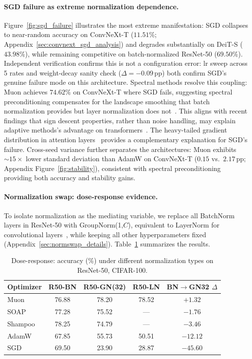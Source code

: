 \paragraph{SGD failure as extreme normalization dependence.}
Figure~\ref{fig:sgd_failure} illustrates the most extreme manifestation: SGD collapses to near-random accuracy on ConvNeXt-T ($11.51\%$; Appendix~\ref{sec:convnext_sgd_analysis}) and degrades substantially on DeiT-S ($43.98\%$), while remaining competitive on batch-normalized ResNet-50 ($69.50\%$).
Independent verification confirms this is not a configuration error: lr sweep across 5 rates and weight-decay sanity check ($\Delta{=}{-}0.09$\,pp) both confirm SGD's genuine failure mode on this architecture.
Spectral methods resolve this coupling: Muon achieves $74.62\%$ on ConvNeXt-T where SGD fails, suggesting spectral preconditioning compensates for the landscape smoothing that batch normalization provides but layer normalization does not~\cite{santurkar2018how}.
This aligns with recent findings that sign descent properties, rather than noise handling, may explain adaptive methods's advantage on transformers~\citep{kunstner2024noise}.
The heavy-tailed gradient distribution in attention layers~\citep{zhang2020adaptive} provides a complementary explanation for SGD's failure.
Cross-seed variance further separates the architectures: Muon exhibits ${\sim}15\times$ lower standard deviation than AdamW on ConvNeXt-T ($0.15$ vs.\ $2.17$\,pp; Appendix Figure~\ref{fig:stability}), consistent with spectral preconditioning providing both accuracy and stability gains.

\paragraph{Normalization swap: dose-response evidence.}
To isolate normalization as the mediating variable, we replace all BatchNorm layers in ResNet-50 with GroupNorm(1,$C$), equivalent to LayerNorm for convolutional layers~\cite{wu2018group,xiong2020layer}, while keeping all other hyperparameters fixed (Appendix~\ref{sec:normswap_details}).
Table~\ref{tab:norm_dose} summarizes the results.

\begin{table}[t]
\centering
\caption{Dose-response: accuracy (\%) under different normalization types on ResNet-50, CIFAR-100.}
\label{tab:norm_dose}
\begin{tabular}{lcccc}
\toprule
Optimizer & R50-BN & R50-GN(32) & R50-LN & BN$\to$GN32 $\Delta$ \\
\midrule
Muon    & 76.88 & 78.20 & 78.52 & $+1.32$ \\
SOAP    & 77.28 & 75.52 & ---   & $-1.76$ \\
Shampoo & 78.25 & 74.79 & ---   & $-3.46$ \\
AdamW   & 67.85 & 55.73 & 50.51 & $-12.12$ \\
SGD     & 69.50 & 23.90 & 28.87 & $-45.60$ \\
\bottomrule
\end{tabular}
\end{table}

